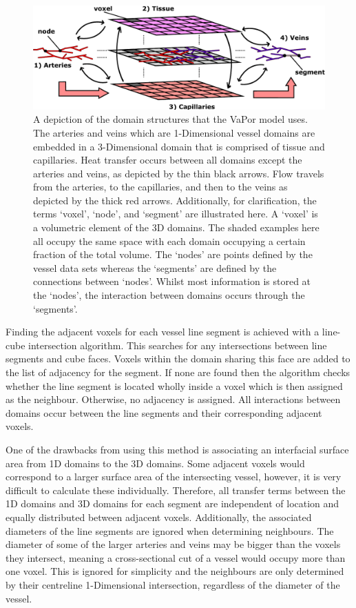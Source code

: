 \documentclass[11pt,english,a4paper,twoside,openright]{report}
\begin{document}
{{{{{{{{\begin{figure}[h]
	\centering
	\includegraphics[width=\textwidth]{Chapter3/Chapter3ExplainDrawing}
	\caption[A depiction of the domain structures and interactions present in the VaPor model]{A depiction of the domain structures that the VaPor model uses. The arteries and veins which are 1-Dimensional vessel domains are embedded in a 3-Dimensional domain that is comprised of tissue and capillaries. Heat transfer occurs between all domains except the arteries and veins, as depicted by the thin black arrows. Flow travels from the arteries, to the capillaries, and then to the veins as depicted by the thick red arrows. Additionally, for clarification, the terms `voxel', `node', and `segment' are illustrated here. A `voxel' is a volumetric element of the 3D domains. The shaded examples here all occupy the same space with each domain occupying a certain fraction of the total volume. The `nodes' are points defined by the vessel data sets whereas the `segments' are defined by the connections between `nodes'. Whilst most information is stored at the `nodes', the interaction between domains occurs through the `segments'.}
	\label{fig:ExplanationDiagram}
\end{figure}

Finding the adjacent voxels for each vessel line segment is achieved with a line-cube intersection algorithm. This searches for any intersections between line segments and cube faces. Voxels within the domain sharing this face are added to the list of adjacency for the segment. If none are found then the algorithm checks whether the line segment is located wholly inside a voxel which is then assigned as the neighbour. Otherwise, no adjacency is assigned. All interactions between domains occur between the line segments and their corresponding adjacent voxels.

One of the drawbacks from using this method is associating an interfacial surface area from 1D domains to the 3D domains. Some adjacent voxels would correspond to a larger surface area of the intersecting vessel, however, it is very difficult to calculate these individually. Therefore, all transfer terms between the 1D domains and 3D domains for each segment are independent of location and equally distributed between adjacent voxels. Additionally, the associated diameters of the line segments are ignored when determining neighbours. The diameter of some of the larger arteries and veins may be bigger than the voxels they intersect, meaning a cross-sectional cut of a vessel would occupy more than one voxel. This is ignored for simplicity and the neighbours are only determined by their centreline 1-Dimensional intersection, regardless of the diameter of the vessel.  

}}}}}}}}
\end{document}
